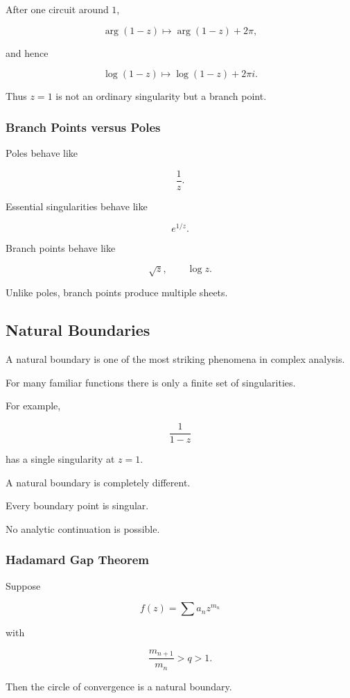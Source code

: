 \documentclass[12pt,a4paper]{article}
\theoremstyle{notespace}
\begin{document}
After one circuit around \(1\),

\[
\arg(1-z)
\mapsto
\arg(1-z)+2\pi,
\]

and hence

\[
\log(1-z)
\mapsto
\log(1-z)+2\pi i.
\]

Thus \(z=1\) is not an ordinary singularity but a branch point.

\subsubsection*{Branch Points versus Poles}

Poles behave like

\[
\frac1z.
\]

Essential singularities behave like

\[
e^{1/z}.
\]

Branch points behave like

\[
\sqrt z,
\qquad
\log z.
\]

Unlike poles, branch points produce multiple sheets.

\bigskip

\subsection{ Natural Boundaries}

A natural boundary is one of the most striking phenomena in complex analysis.

For many familiar functions there is only a finite set of singularities.

For example,

\[
\frac1{1-z}
\]

has a single singularity at \(z=1\).

A natural boundary is completely different.

Every boundary point is singular.

No analytic continuation is possible.

\subsubsection*{Hadamard Gap Theorem}

Suppose

\[
f(z)
=
\sum a_n z^{m_n}
\]

with

\[
\frac{m_{n+1}}{m_n}>q>1.
\]

Then the circle of convergence is a natural boundary.
\end{document}
